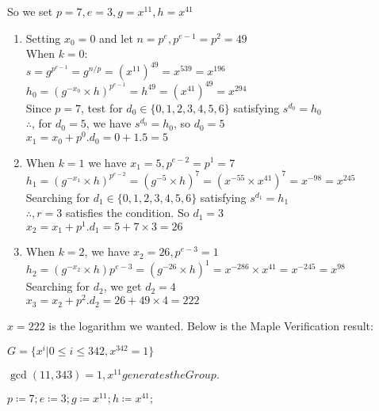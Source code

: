 \documentclass[11pt,a4paper,fleqn]{article}
\begin{document}
\begin{enumerate}[1.]
\begin{flushleft}
\begin{enumerate}
				So we set $p = 7, e = 3, g = x^{11}, h = x^{41}$
				\begin{enumerate}[Step 1.]
					\item Setting $x_0 = 0$ and let $n = p^e, p^{e-1} = p^2 = 49 $\\
					When $k = 0$:\\
					$s = g^{p^{e-1}} = g^{n/p} = (x^{11})^{49} = x^{539} = x^{196}$\\
					$h_0 = (g^{-x_0} \times h)^{p^{e-1}} = h^{49} = (x^{41})^{49} = x^{294}$ \\
					Since $p = 7$, test for $d_0 \in \{0, 1, 2, 3, 4, 5, 6\}$ satisfying $s^{d_0} = h_0$\\
					$\therefore$, for $d_0 = 5$, we have $s^{d_0} = h_0$, so $d_0 = 5$\\
					$x_1 = x_0 + p^0.d_0 = 0 + 1.5 = 5$
					\item When $k = 1$ we have $x_1 = 5, p^{e-2} = p^1 = 7$\\
					$h_1 = (g^{-x_1}\times h)^{p^{e-2}} = (g^{-5}\times h)^7 = (x^{-55} \times x^{41})^7 = x^{-98} = x^{245}$\\
					Searching for $d_1 \in \{0, 1, 2, 3, 4, 5, 6\}$ satisfying $s^{d_1} = h_1$\\
					$\therefore, r = 3$ satisfies the condition. So $d_1 = 3$\\
					$x_2 = x_1 + p^1.d_1 = 5 + 7 \times 3 = 26$\\
					\item When $k = 2$, we have $x_2 = 26, p^{e-3} = 1$\\
					$h_2 = (g^{-x_2} \times h)p^{e-3} = (g^{-26} \times h)^1 = x^{-286} \times x^{41} = x^{-245} = x^{98}$\\
					Searching for $d_2$, we get $d_2 = 4$\\
					$x_3 = x_2 + p^2.d_2 = 26 + 49 \times 4 = 222$  
				\end{enumerate}
				$x = 222$ is the logarithm we wanted.
				\bigbreak
				Below is the Maple Verification result:
				\begin{mdframed}
					
					\begin{Maple Normal}
						{$ \displaystyle G ={\{x^{i}| 0\le i \le 342,x^{342}=1\}} $}
					\end{Maple Normal}
					\begin{Maple Normal}
						{$ \displaystyle \gcd (11,343)=1,x^{11}\mathit{generates} \mathit{the} \mathit{Group} . $}
					\end{Maple Normal}
					\mapleinput
					{$ \displaystyle p \coloneqq 7;e \coloneqq 3;g \coloneqq x^{11};h \coloneqq x^{41}; $}
					

\end{mdframed}
\end{enumerate}
\end{flushleft}
\end{enumerate}
\end{document}

